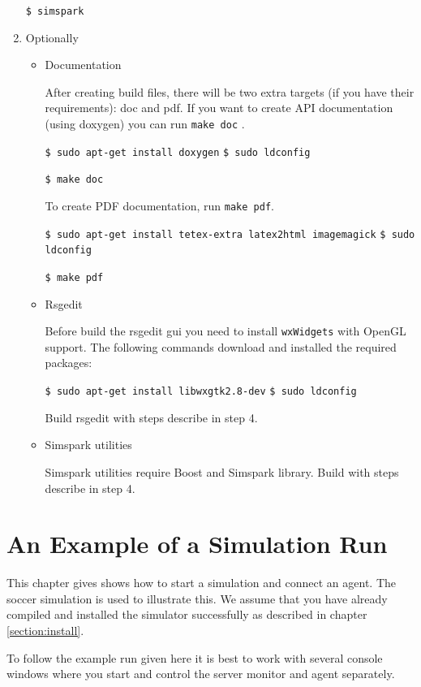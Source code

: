 \begin{enumerate}
\texttt{\$ simspark}

\item Optionally

\begin{itemize}
\item Documentation

After creating build files, there will be two extra targets (if you have their requirements): doc and pdf. If you want to create API documentation (using doxygen) you can run \texttt{make doc} .

\texttt{\$ sudo apt-get install doxygen}
\texttt{\$ sudo ldconfig}

\texttt{\$ make doc}

To create PDF documentation, run \texttt{make pdf}.

\texttt{\$ sudo apt-get install tetex-extra latex2html imagemagick}
\texttt{\$ sudo ldconfig}

\texttt{\$ make pdf}

\item Rsgedit

Before build the rsgedit gui you need to install \texttt{wxWidgets} with OpenGL support. The following commands download and installed the required packages:

\texttt{\$ sudo apt-get install libwxgtk2.8-dev}
\texttt{\$ sudo ldconfig}

Build rsgedit with steps describe in step 4.

\item Simspark utilities

Simspark utilities require Boost and Simspark library. Build with steps describe in step 4.

\end{itemize}
\end{enumerate}

\section{An Example of a Simulation Run}

This chapter gives shows how to start a simulation and connect an
agent. The soccer simulation is used to illustrate this. We assume
that you have already compiled and installed the simulator successfully
as described in chapter \ref{section:install}. 

To follow the example run given here it is best to work with several
console windows where you start and control the server monitor and
agent separately.

